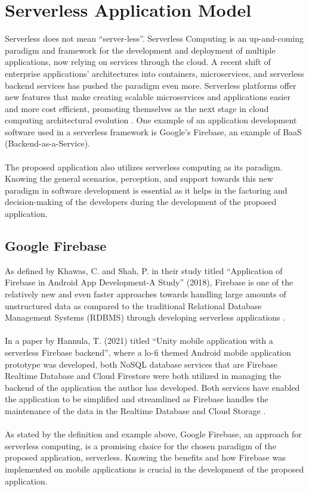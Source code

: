 \section{Serverless Application Model}

Serverless does not mean “server-less”. Serverless Computing is an up-and-coming paradigm and framework for the development and deployment of multiple applications, now relying on services through the cloud. A recent shift of enterprise applications’ architectures into containers, microservices, and serverless backend services has pushed the paradigm even more. Serverless platforms offer new features that make creating scalable microservices and applications easier and more cost efficient, promoting themselves as the next stage in cloud computing architectural evolution \cite{castro2017serverless}. One example of an application development software used in a serverless framework is Google’s Firebase, an example of BaaS (Backend-as-a-Service). \\
\\The proposed application also utilizes serverless computing as its paradigm. Knowing the general scenarios, perception, and support towards this new paradigm in software development is essential as it helps in the factoring and decision-making of the developers during the development of the proposed application.

\subsection{Google Firebase}

As defined by Khawas, C. and Shah, P. in their study titled “Application of Firebase in Android App Development-A Study” (2018), Firebase is one of the relatively new and even faster approaches towards handling large amounts of unstructured data as compared to the traditional Relational Database Management Systems (RDBMS) through developing serverless applications 
\cite{khawas2018application}.
\\\\In a paper by Hannula, T. (2021) titled “Unity mobile application with a serverless Firebase backend”, where a lo-fi themed Android mobile application prototype was developed, both NoSQL database services that are Firebase Realtime Database and Cloud Firestore were both utilized in managing the backend of the application the author has developed. Both services have enabled the application to be simplified and streamlined as Firebase handles the maintenance of the data in the Realtime Database and Cloud Storage \cite{hannula2021unity}.
\\\\As stated by the definition and example above, Google Firebase, an approach for serverless computing, is a promising choice for the chosen paradigm of the proposed application, serverless. Knowing the benefits and how Firebase was implemented on mobile applications is crucial in the development of the proposed application.


